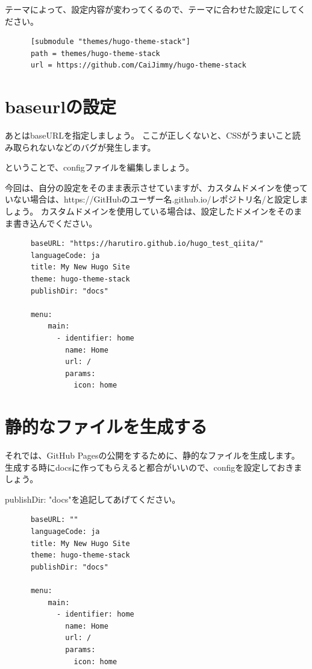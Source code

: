   テーマによって、設定内容が変わってくるので、テーマに合わせた設定にしてください。

  \begin{tcolorbox}[breakable]
    \begin{verbatim}
      [submodule "themes/hugo-theme-stack"]
      path = themes/hugo-theme-stack
      url = https://github.com/CaiJimmy/hugo-theme-stack
    \end{verbatim}
  \end{tcolorbox}

\section{baseurlの設定}

  あとはbaseURLを指定しましょう。
  ここが正しくないと、CSSがうまいこと読み取られないなどのバグが発生します。

  ということで、configファイルを編集しましょう。

  今回は、自分の設定をそのまま表示させていますが、カスタムドメインを使っていない場合は、https://GitHubのユーザー名.github.io/レポジトリ名/と設定しましょう。
  カスタムドメインを使用している場合は、設定したドメインをそのまま書き込んでください。

  \begin{tcolorbox}[breakable]
    \begin{verbatim}
      baseURL: "https://harutiro.github.io/hugo_test_qiita/"
      languageCode: ja
      title: My New Hugo Site
      theme: hugo-theme-stack
      publishDir: "docs"

      menu:
          main:
            - identifier: home
              name: Home
              url: /
              params:
                icon: home
    \end{verbatim}
  \end{tcolorbox}

\section{静的なファイルを生成する}

  それでは、GitHub Pagesの公開をするために、静的なファイルを生成します。
  生成する時にdocsに作ってもらえると都合がいいので、configを設定しておきましょう。

  publishDir: "docs"を追記してあげてください。

  \begin{tcolorbox}[breakable]
    \begin{verbatim}
      baseURL: ""
      languageCode: ja
      title: My New Hugo Site
      theme: hugo-theme-stack
      publishDir: "docs"

      menu:
          main:
            - identifier: home
              name: Home
              url: /
              params:
                icon: home
    \end{verbatim}
  \end{tcolorbox}


